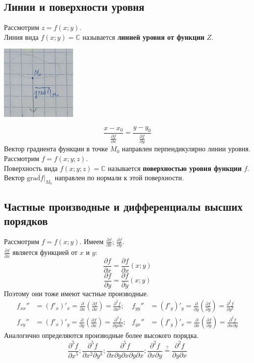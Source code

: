 \documentclass[12pt]{article}
\let\ORIincludegraphics\includegraphics
\renewcommand{\includegraphics}[2][]{\ORIincludegraphics[scale=0.65,#1]{#2}}
\begin{document}
    \subsection{Линии и поверхности уровня}\noindent
    Рассмотрим $z = f(x;y)$.\\
    Линия вида $f(x;y) = \mathbb{C}$ называется \textbf{линией уровня от функции} $Z$.
    \begin{center}
        \includegraphics{7.11.1.png}
    \end{center}
    \[ \frac{x-x_0}{\frac{\partial f}{\partial x}} = \frac{y-y_0}{\frac{\partial f}{\partial y}} \]
    Вектор градиента функции в точке $M_0$ направлен перпендикулярно линии уровня.\\
    Рассмотрим $f = f(x;y;z)$.\\
    Поверхность вида $f(x;y;z) = \mathbb{C}$ называется \textbf{поверхностью уровня функции} $f$.\\
    Вектор $\overline{\text{grad}f \Big|_{M_0}}$ направлен по нормали к этой поверхности.

    \subsection{Частные производные и дифференциалы высших порядков}\noindent
    Рассмотрим $f = f(x;y)$. Имеем $\frac{\partial f}{\partial x}$; $\frac{\partial f}{\partial y}$.\\
    $\frac{\partial f}{\partial x}$ является функцией от $x$ и $y$: 
    \[ \frac{\partial f}{\partial x} = \frac{\partial f}{\partial x} (x; y) \]
    \[ \frac{\partial f}{\partial y} = \frac{\partial f}{\partial y} (x; y) \]
    Поэтому они тоже имеют частные производные.
    \begin{align*}
        f_{xx}'' &= (f'_x)'_x = \frac{\partial }{\partial x} \left( \frac{\partial f}{\partial x} \right) = \frac{\partial^2 f}{\partial x^2}; & f_{yy}'' &= (f'_y)'_y = \frac{\partial }{\partial y} \left( \frac{\partial f}{\partial y} \right) = \frac{\partial^2 f}{\partial y^2}\\
        f_{xy}'' &= (f'_x)'_y = \frac{\partial }{\partial y} \left( \frac{\partial f}{\partial x} \right) = \frac{\partial^2 f}{\partial y \partial x}; & f_{yx}'' &= (f'_y)'_x = \frac{\partial }{\partial x} \left( \frac{\partial f}{\partial y} \right) = \frac{\partial^2 f}{\partial x \partial y}
    \end{align*} 
    Аналогично определяются производные более высокого порядка.
    \[ \frac{\partial^5 f}{\partial x^5}; \frac{\partial^5 f}{\partial x^2 \partial y^3}; \frac{\partial^5 f}{\partial x \partial y \partial x \partial y \partial x}; \frac{\partial^2 f}{\partial x \partial y} \overset{?}{=} \frac{\partial^2 f}{\partial y \partial x} \]
\end{document}
